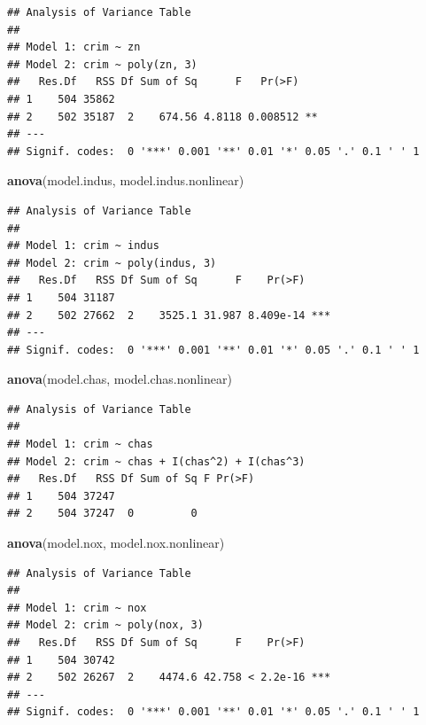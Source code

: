 \documentclass[]{article}
\newenvironment{Shaded}{\begin{snugshade}}{\end{snugshade}}
\newcommand{\KeywordTok}[1]{\textcolor[rgb]{0.13,0.29,0.53}{\textbf{#1}}}
\newcommand{\NormalTok}[1]{#1}
\begin{document}
\begin{verbatim}
## Analysis of Variance Table
## 
## Model 1: crim ~ zn
## Model 2: crim ~ poly(zn, 3)
##   Res.Df   RSS Df Sum of Sq      F   Pr(>F)   
## 1    504 35862                                
## 2    502 35187  2    674.56 4.8118 0.008512 **
## ---
## Signif. codes:  0 '***' 0.001 '**' 0.01 '*' 0.05 '.' 0.1 ' ' 1
\end{verbatim}

\begin{Shaded}
\begin{Highlighting}[]
\KeywordTok{anova}\NormalTok{(model.indus, model.indus.nonlinear)}
\end{Highlighting}
\end{Shaded}

\begin{verbatim}
## Analysis of Variance Table
## 
## Model 1: crim ~ indus
## Model 2: crim ~ poly(indus, 3)
##   Res.Df   RSS Df Sum of Sq      F    Pr(>F)    
## 1    504 31187                                  
## 2    502 27662  2    3525.1 31.987 8.409e-14 ***
## ---
## Signif. codes:  0 '***' 0.001 '**' 0.01 '*' 0.05 '.' 0.1 ' ' 1
\end{verbatim}

\begin{Shaded}
\begin{Highlighting}[]
\KeywordTok{anova}\NormalTok{(model.chas, model.chas.nonlinear)}
\end{Highlighting}
\end{Shaded}

\begin{verbatim}
## Analysis of Variance Table
## 
## Model 1: crim ~ chas
## Model 2: crim ~ chas + I(chas^2) + I(chas^3)
##   Res.Df   RSS Df Sum of Sq F Pr(>F)
## 1    504 37247                      
## 2    504 37247  0         0
\end{verbatim}

\begin{Shaded}
\begin{Highlighting}[]
\KeywordTok{anova}\NormalTok{(model.nox, model.nox.nonlinear)}
\end{Highlighting}
\end{Shaded}

\begin{verbatim}
## Analysis of Variance Table
## 
## Model 1: crim ~ nox
## Model 2: crim ~ poly(nox, 3)
##   Res.Df   RSS Df Sum of Sq      F    Pr(>F)    
## 1    504 30742                                  
## 2    502 26267  2    4474.6 42.758 < 2.2e-16 ***
## ---
## Signif. codes:  0 '***' 0.001 '**' 0.01 '*' 0.05 '.' 0.1 ' ' 1
\end{verbatim}
\end{document}
